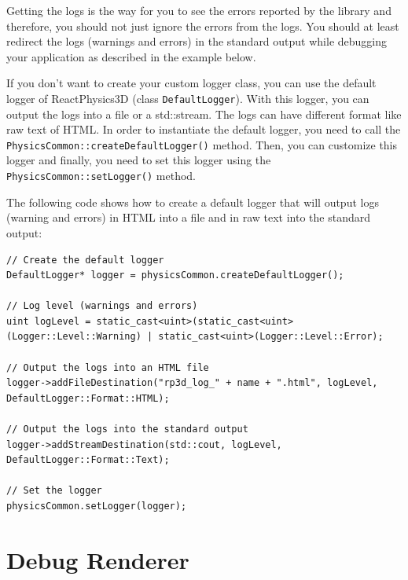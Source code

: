 \documentclass[a4paper,12pt]{article}
\begin{document}
    Getting the logs is the way for you to see the errors reported by the library and therefore, you should not just ignore the errors from the logs.
    You should at least redirect the logs (warnings and errors) in the standard output while debugging your application as described in the example
    below. \\

    \begin{sloppypar}
    If you don't want to create your custom logger class, you can use the default logger of ReactPhysics3D (class \texttt{DefaultLogger}). With this
    logger, you can output the logs into
    a file or a std::stream. The logs can have different format like raw text of HTML. In order to instantiate the default logger, you need to call the
    \texttt{PhysicsCommon::createDefaultLogger()} method. Then, you can customize this logger and finally, you need to set this logger using the
    \texttt{PhysicsCommon::setLogger()} method. \\
    \end{sloppypar}

    The following code shows how to create a default logger that will output logs (warning and errors) in HTML into a file and in raw text into
    the standard output: \\

    \begin{lstlisting}
// Create the default logger
DefaultLogger* logger = physicsCommon.createDefaultLogger();

// Log level (warnings and errors)
uint logLevel = static_cast<uint>(static_cast<uint>(Logger::Level::Warning) | static_cast<uint>(Logger::Level::Error);

// Output the logs into an HTML file
logger->addFileDestination("rp3d_log_" + name + ".html", logLevel, DefaultLogger::Format::HTML);

// Output the logs into the standard output
logger->addStreamDestination(std::cout, logLevel, DefaultLogger::Format::Text);

// Set the logger
physicsCommon.setLogger(logger);
    \end{lstlisting}

   \section{Debug Renderer}
  
\end{document}
